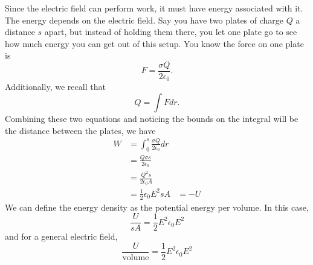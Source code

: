 \documentclass[nobib]{tufte-handout}
\begin{document}
Since the electric field can perform work, it must have
energy associated with it. The energy depends on the electric field. 
Say you have two plates of charge $Q$ a distance $s$ apart, but instead of 
holding them there, you let one plate go to see how much energy 
you can get out of this setup. You know the force on one plate is 
\[F = \frac{\sigma Q}{2 \epsilon_0}.\]
Additionally, we recall that 
\[Q = \int F dr.\]
Combining these two equations and noticing the bounds on the integral 
will be the distance between the plates, we have 
\begin{align*}
    W &= \int_{0}^{s} \frac{\sigma Q}{2 \epsilon_0} dr \\
    &= \frac{Q\sigma s}{2 \epsilon_0} \\
    &= \frac{Q^2 s}{2 \epsilon_0 A} \\
    &= \frac{1}{2} \epsilon_0 E^2 s A
    &= -U
\end{align*}
We can define the energy density as the potential energy per 
volume. In this case, 
\[\frac{U}{s A} = \frac{1}{2} E^2 \epsilon_0 E^2\]
and for a general electric field, 
\[\frac{U}{\text{volume}} = \frac{1}{2} E^2 \epsilon_0 E^2\]
\end{document}
